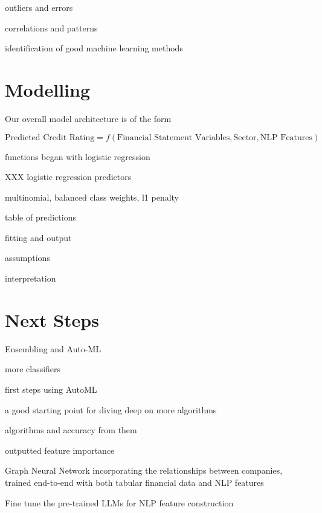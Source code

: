 \documentclass{article}
\begin{document}
    outliers and errors

    correlations and patterns

    identification of good machine learning methods

    \section*{Modelling}

    Our overall model architecture is of the form

    \begin{equation*}
        \text{Predicted Credit Rating} = f(\text{Financial Statement Variables}, \text{Sector}, \text{NLP Features})
    \end{equation*}

    functions began with logistic regression

    XXX logistic regression predictors

    multinomial, balanced class weights, l1 penalty

    table of predictions

    fitting and output

    assumptions
    
    interpretation

    \section*{Next Steps}

    Ensembling and Auto-ML

    more classifiers
    
    first steps using AutoML

    a good starting point for diving deep on more algorithms

    algorithms and accuracy from them

    outputted feature importance

    Graph Neural Network incorporating the relationships between companies, trained end-to-end with both tabular financial data and NLP features
    

    Fine tune the pre-trained LLMs for NLP feature construction
    
    \clearpage
    \newpage

    
    



\end{document}

